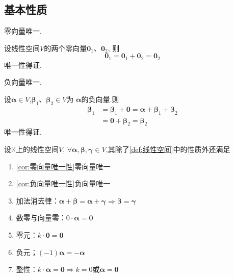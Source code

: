 \subsection{基本性质}
\begin{green}
\begin{corollary}[零向量唯一性]\label{cor:零向量唯一性}
    零向量唯一.
\end{corollary}
\begin{Proof}
设线性空间$V$的两个零向量$\bm{0}_1$、$\bm{0}_2$,
则\[
\bm{0}_1=\bm{0}_1+\bm{0}_2=\bm{0}_2
\]
唯一性得证.
\end{Proof}
\end{green}
\begin{green}
\begin{corollary}[负向量唯一性]\label{cor:负向量唯一性}
    负向量唯一.
\end{corollary}
\begin{Proof}
设$\bm{\alpha}\in V$,$\bm{\beta}_1$、$\bm{\beta}_2\in V$为
$\bm{\alpha}$的负向量.则
\begin{align*}
    \bm{\beta}_1&=\bm{\beta}_1+\bm{0}=\bm{\alpha}+\bm{\beta}_1+\bm{\beta}_2\\
    &=\bm{0}+\bm{\beta}_2=\bm{\beta}_2
\end{align*}
唯一性得证.
\end{Proof}
\end{green}
\begin{formal}
\begin{proposition}[线性空间的基本性质]\label{prop:线性空间的基本性质}
设$\mathbb{K}$上的线性空间$V$,
$\forall \bm{\alpha},
\bm{\beta},\bm{\gamma} 
\in V$,其除了\cref{def:线性空间}中的性质外还满足
\begin{enumerate}[label=\textup{(\arabic*)}]
    \item \cref{cor:零向量唯一性}零向量唯一
    \item \cref{cor:负向量唯一性}负向量唯一
    \item 加法消去律：$
    \bm{\alpha} + \bm{\beta}
    = \bm{\alpha}+\bm{\gamma}
    \Longrightarrow 
    \bm{\beta} = \bm{\gamma}
    $
    \item 数零与向量零：$0 \cdot \bm{\alpha}
    = \bm{0}
    $
    \item 零元：$k \cdot \bm{0} = \bm{0}$
    \item 负元；$ \left(-1\right)\bm{\alpha}
    = -\bm{\alpha}
    $
    \item 整性：$k\cdot \bm{\alpha} = \bm{0}
    \Longrightarrow k = 0$或$
    \bm{\alpha}=\bm{0}$
\end{enumerate}
\end{proposition}
\end{formal}
\newpage
